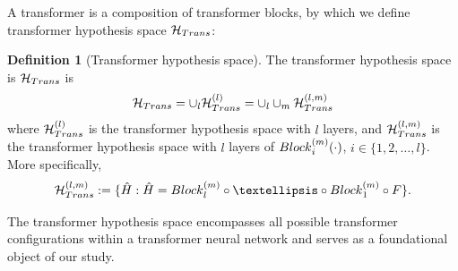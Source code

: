 \documentclass{article}
\theoremstyle{plain}
\theoremstyle{definition}
\newtheorem{definition}[theorem]{Definition}
\theoremstyle{remark}
\begin{document}
%
A transformer is a composition of transformer blocks, by which we define transformer hypothesis space $\mathcal{H}_{\rm Trans}$:
\begin{definition}[Transformer hypothesis space]\label{def:transformer hyper sp} The transformer hypothesis space is $\mathcal{H}_{\rm Trans}$ is
    \begin{equation}
        \mathcal{H}_{\rm Trans} = \cup_{l} \mathcal{H}_{\rm Trans}^{(l)} = \cup_{l} \cup_{m} \mathcal{H}_{\rm Trans}^{(l,m)}
    \end{equation}
    where $\mathcal{H}_{\rm Trans}^{(l)}$ is the transformer hypothesis space with $l$ layers, and $\mathcal{H}_{\rm Trans}^{(l,m)}$ is the transformer hypothesis space with $l$ layers of ${\rm Block}^{(m)}_i(\cdot)$, $i \in \{1,2, \dots , l\}$. More specifically, 
    \begin{equation}  
    \small
    \mathcal{H}_{\rm Trans}^{(l,m)} := 
        \{\hat{H}: \hat{H} = {\rm Block}_l^{(m)}\circ \dots \circ {\rm Block}_1^{(m)}\circ F\}.
    \end{equation}
    \label{def: transformer hypothesis space}
\end{definition}
The transformer hypothesis space encompasses all possible transformer configurations within a transformer neural network and serves as a foundational object of our study.
\end{document}
